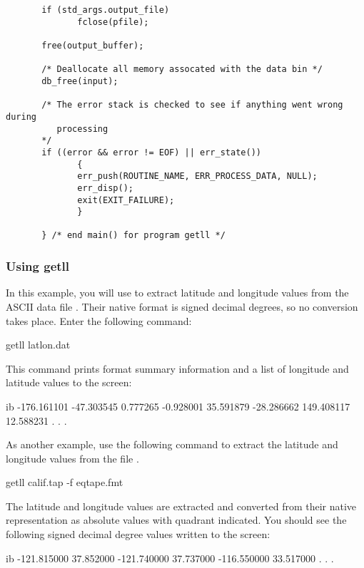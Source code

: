 \begin{verbatim}
       if (std_args.output_file)
              fclose(pfile);

       free(output_buffer);
       
       /* Deallocate all memory assocated with the data bin */
       db_free(input);

       /* The error stack is checked to see if anything went wrong during 
          processing
       */
       if ((error && error != EOF) || err_state())
              {
              err_push(ROUTINE_NAME, ERR_PROCESS_DATA, NULL);
              err_disp();
              exit(EXIT_FAILURE);
              }

       } /* end main() for program getll */
\end{verbatim}
\T\egroup

\subsubsection{Using getll}

In this example, you will use  to extract latitude and
longitude values from the ASCII data file . Their
native format is signed decimal degrees, so no conversion takes place.
Enter the following command:

\begin{example}
getll latlon.dat 
\end{example}

This command prints format summary information and a list of longitude
and latitude values to the screen:

\begin{vcode}{ib}
-176.161101   -47.303545
   0.777265    -0.928001
  35.591879   -28.286662
 149.408117    12.588231
       .
       .
       .
\end{vcode}

As another example, use the following command to extract the latitude
and longitude values from the file .

\begin{example}
getll calif.tap -f eqtape.fmt 
\end{example}

The latitude and longitude values are extracted and converted from
their native representation as absolute values with quadrant
indicated. You should see the following signed decimal degree values
written to the screen:

\begin{vcode}{ib}
-121.815000     37.852000 
-121.740000     37.737000 
-116.550000     33.517000 
       .
       .
       . 
\end{vcode}

